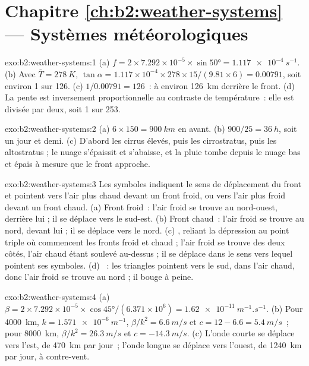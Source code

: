 \section*{Chapitre \ref{ch:b2:weather-systems} --- Systèmes météorologiques}

\begin{solution}{exo:b2:weather-systems:1}
(a) $f = 2 \times 7.292 \times 10^{-5} \times \sin\ang{50} = \qty{1.117e-4}{s^{-1}}$. (b) Avec
$\bar T = \qty{278}{K}$, $\tan\alpha = 1.117 \times 10^{-4} \times 278 \times 15/(9.81 \times 6)
= 0.00791$, soit environ 1 sur 126. (c) $1/0.00791 = 126$~: à environ \qty{126}{km} derrière le front. (d) La
pente est inversement proportionnelle au contraste de température~: elle est divisée par deux, soit 1 sur 253.
\end{solution}

\begin{solution}{exo:b2:weather-systems:2}
(a) $6 \times 150 = \qty{900}{km}$ en avant. (b) $900/25 = \qty{36}{h}$, soit un jour et demi. (c) D'abord
les cirrus élevés, puis les cirrostratus, puis les altostratus ; le nuage s'épaissit et s'abaisse, et la pluie
tombe depuis le nuage bas et épais à mesure que le front approche.
\end{solution}

\begin{solution}{exo:b2:weather-systems:3}
Les symboles indiquent le sens de déplacement du front et pointent vers l'air plus chaud devant un front froid, ou vers l'air
plus froid devant un front chaud. (a) Front froid~: l'air froid se trouve au nord-ouest, derrière lui ; il se déplace vers le sud-est.
(b) Front chaud~: l'air froid se trouve au nord, devant lui ; il se déplace vers le nord.
(c) , reliant la dépression au point triple où commencent les fronts froid et chaud ; l'air froid se trouve des deux côtés,
l'air chaud étant soulevé au-dessus ; il se déplace dans le sens vers lequel pointent ses symboles.
(d) ~: les triangles pointent vers le sud, dans l'air chaud, donc l'air froid se trouve au nord ; il
bouge à peine.
\end{solution}

\begin{solution}{exo:b2:weather-systems:4}
(a) $\beta = 2 \times 7.292 \times 10^{-5} \times \cos\ang{45}/(6.371 \times 10^6) =
\qty{1.62e-11}{m^{-1}.s^{-1}}$. (b) Pour \qty{4000}{km}, $k = \qty{1.571e-6}{m^{-1}}$, $\beta/k^2 =
\qty{6.6}{m/s}$ et $c = 12 - 6.6 = \qty{5.4}{m/s}$~; pour \qty{8000}{km}, $\beta/k^2 =
\qty{26.3}{m/s}$ et $c = \qty{-14.3}{m/s}$. (c) L'onde courte se déplace vers l'est, de \qty{470}{km} par jour~;
l'onde longue se déplace vers l'ouest, de \qty{1240}{km} par jour, à contre-vent.
\end{solution}

